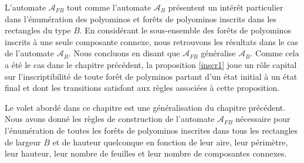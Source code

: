  
 
 L'automate $\mathcal{A}_{FB}$ tout comme l'automate $\mathcal{A}_{B}$ présentent un intérêt particulier dans l'énumération des polyominos et forêts de polyominos inscrits dans les rectangles du type $B$. En considérant le sous-ensemble des forêts de polyominos inscrits à une seule composante connexe, nous retrouvons les résultats dans le cas de l’automate $\mathcal{A}_{B}$. Nous concluons en disant  que $\mathcal{A}_{FB}$  généralise $\mathcal{A}_{B}.$ Comme cela a été le cas dans le chapitre précédent, la proposition \ref{inscr1} joue un rôle capital sur  l'inscriptibilité de toute forêt de polyminos partant d'un état initial à un état final et dont les transitions satisfont  aux règles associées à cette proposition.
 
 
 Le volet abordé dans ce chapitre est  une généralisation du chapitre précédent. Nous avons donné les règles de construction de l'automate $\mathcal{A}_{FB}$ nécessaire pour l'énumération de toutes les forêts de polyominos inscrites dans tous les rectangles de largeur $B$ et de hauteur quelconque en fonction de leur aire, leur périmètre, leur hauteur, leur nombre de feuilles et leur nombre de composantes connexes.